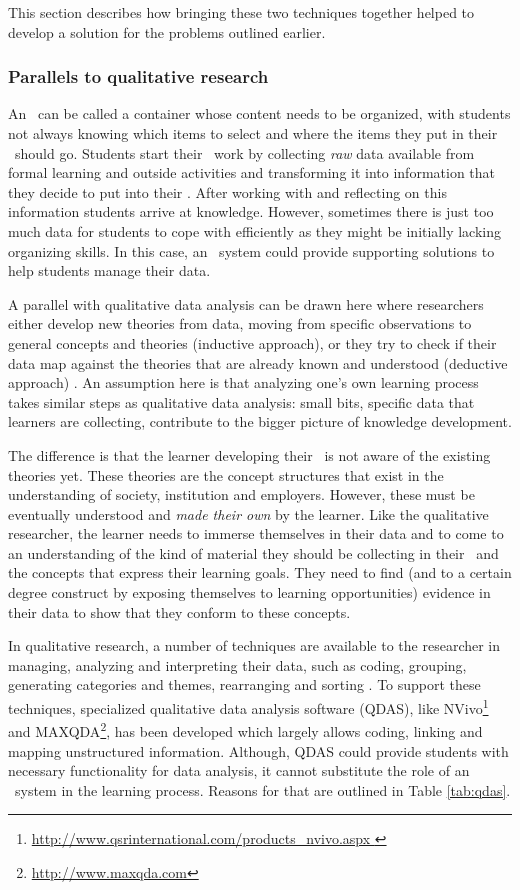 This section describes how bringing these two techniques together helped to
develop a solution for the problems outlined earlier.

\subsubsection{Parallels to qualitative research}

An \ep~can be called a container whose content needs to be organized, with
students not always knowing which items to select and where the items they put
in their \ep~should go. Students start their \ep~work by collecting \textit{raw}
data available from formal learning and outside activities and transforming it
into information that they decide to put into their \ep. After working with and
reflecting on this information students arrive at knowledge. However, sometimes
there is just too much data for students to cope with efficiently as they might
be initially lacking organizing skills. In this case, an \ep~system could
provide supporting solutions to help students manage their data.

A parallel with qualitative data analysis can be drawn here where researchers
either develop new theories from data, moving from specific observations to
general concepts and theories (inductive approach), or they try to check if
their data map against the theories that are already known and understood
(deductive approach) \citep{Strauss2008,Patton2002}. An assumption here is that
analyzing one's own learning process takes similar steps as qualitative data
analysis: small bits, specific data that learners are collecting, contribute to
the bigger picture of knowledge development. 

The difference is that the learner developing their \ep~is not aware of the
existing theories yet. These theories are the concept structures that exist in
the understanding of society, institution and employers. However, these must be
eventually understood and \textit{made their own} by the learner. Like the
qualitative researcher, the learner needs to immerse themselves in their data
and to come to an understanding of the kind of material they should be
collecting in their \ep~and the concepts that express their learning goals. They
need to find (and to a certain degree construct by exposing themselves to
learning opportunities) evidence in their data to show that they conform to
these concepts.

In qualitative research, a number of techniques are available to the researcher
in managing, analyzing and interpreting their data, such as coding, grouping,
generating categories and themes, rearranging and sorting \citep{Marshall2010}.
To support these techniques, specialized qualitative data analysis software
(QDAS), like
NVivo\footnote{\url{http://www.qsrinternational.com/products_nvivo.aspx }} and
MAXQDA\footnote{\url{http://www.maxqda.com}}, has been developed which largely
allows coding, linking and mapping unstructured information. Although, QDAS
could provide students with necessary functionality for data analysis, it cannot
substitute the role of an \ep~system in the learning process. Reasons for
that are outlined in Table \ref{tab:qdas}.

